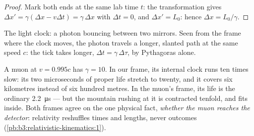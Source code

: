 \begin{proof}
Mark both ends at the same lab time $t$: the transformation gives
$\Delta x' = \gamma(\Delta x - v\Delta t) = \gamma\,\Delta x$ with
$\Delta t = 0$, and $\Delta x' = L_0$: hence $\Delta x = L_0/\gamma$.
\end{proof}

\begin{omfigure}

{\small The light clock: a photon bouncing between two mirrors. Seen
from the frame where the clock moves, the photon travels a longer,
slanted path at the same speed $c$: the tick takes longer,
$\Delta t = \gamma\,\Delta\tau$, by Pythagoras alone.}
\end{omfigure}

\begin{example}\label{ex:b3:relativistic-kinematics:muon}
A muon at $v = 0.995c$ has $\gamma = 10$. In our frame, its internal
clock runs ten times slow: its two microseconds of proper life stretch
to twenty, and it covers six kilometres instead of six hundred metres.
In the muon's frame, its life is the ordinary \qty{2.2}{\micro s} ---
but the mountain rushing at it is contracted tenfold, and fits inside.
Both frames agree on the one physical fact, \emph{whether the muon
reaches the detector}: relativity reshuffles times and lengths, never
outcomes (\cref{pb:b3:relativistic-kinematics:1}).
\end{example}

